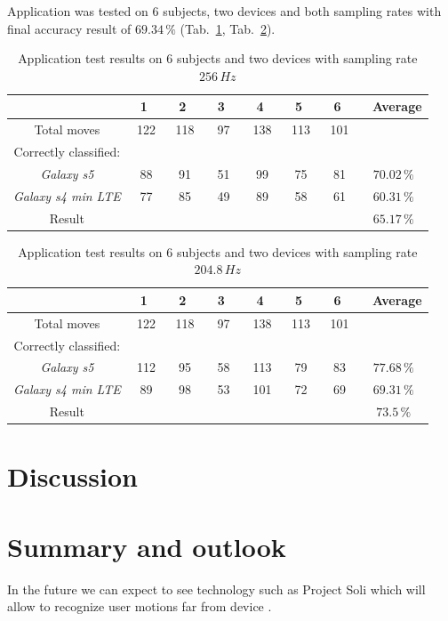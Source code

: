 \documentclass[conference]{IEEEtran}
\begin{document}
Application was tested on 6 subjects, two devices and both sampling rates with final accuracy result of $69.34\,\%$ (Tab.~\ref{Results256}, Tab.~\ref{Results204}).

\begin{table}[h!]
	\caption{Application test results on 6 subjects and two devices with sampling rate $256\,Hz$}
	\begin{center}
		\begin{tabular}{c|cccccc|c}
			& \ 1 \ &\ 2 \ &\ 3 \ &\ 4 \ &\ 5 \ &\ 6 \ &\ Average\\
			\hline
			Total moves&122&118&97&138&113&101\\
			\hline
			Correctly classified:&&&&&&\\
			\emph{Galaxy s5}&88&91&51&99&75&81&$70.02\,\%$\\
			\emph{Galaxy s4 min LTE}&77&85&49&89&58&61&$60.31\,\%$\\
			\hline
		    Result&&&&&&&$65.17\,\%$
		\end{tabular}
		\label{Results256}
	\end{center}
\end{table}

\begin{table}[h!]
	\caption{Application test results on 6 subjects and two devices with sampling rate $204.8\,Hz$}
	\begin{center}
		\begin{tabular}{c|cccccc|c}
			& \ 1 \ &\ 2 \ &\ 3 \ &\ 4 \ &\ 5 \ &\ 6 \ &\ Average\\
			\hline
			Total moves&122&118&97&138&113&101\\
			\hline
			Correctly classified:&&&&&&\\
			\emph{Galaxy s5}&112&95&58&113&79&83&$77.68\,\%$\\
			\emph{Galaxy s4 min LTE}&89&98&53&101&72&69&$69.31\,\%$\\
			\hline
		    Result&&&&&&&$73.5\,\%$
		\end{tabular}
		\label{Results204}
	\end{center}
\end{table}

\section{Discussion}
 
\section{Summary and outlook}
In the future we can expect to see technology such as Project Soli which will allow to recognize user motions far from device \cite{ProjectSoli}.
\end{document}
